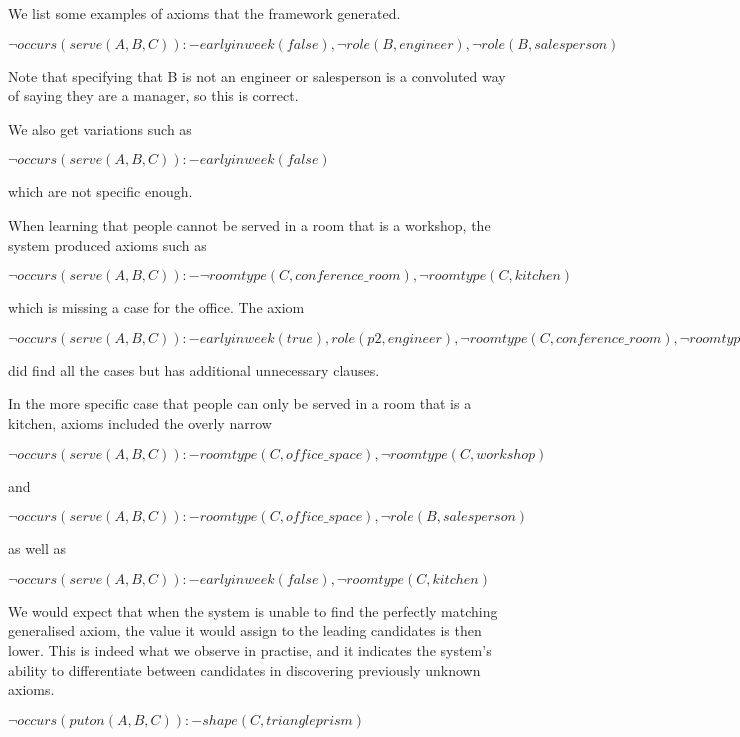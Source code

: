 We list some examples of axioms that the framework generated.

$\neg occurs(serve(A,B,C)) :- earlyinweek(false), \neg role(B,engineer), \neg role(B,salesperson)$

Note that specifying that B is not an engineer or salesperson is a 
convoluted way of saying they are a manager, so this is correct.

We also get variations such as 

$\neg occurs(serve(A,B,C)) :- earlyinweek(false)$

which are not specific enough.

When learning that people cannot be served in a room that is a workshop, the system produced
axioms such as 

$\neg occurs(serve(A,B,C)) :- \neg roomtype(C,conference\_room), \neg roomtype(C,kitchen)$

which is missing a case for the office. The axiom

$\neg occurs(serve(A,B,C)) :- earlyinweek(true), role(p2, engineer), \neg roomtype(C, conference\_room),
\neg roomtype(C, kitchen), \neg roomtype(C, office\_space)$

did find all the cases but has additional unnecessary clauses.

In the more specific case that people can only be served in a room that is a kitchen, 
axioms included the overly narrow

$\neg occurs(serve(A,B,C)) :- roomtype(C,office\_space), \neg roomtype(C,workshop)$

and

$\neg occurs(serve(A,B,C)) :- roomtype(C, office\_space), \neg role(B, salesperson)$

as well as 

$\neg occurs(serve(A,B,C)) :- earlyinweek(false), \neg roomtype(C, kitchen)$

%

We would expect that when the system is unable to find the perfectly matching 
generalised axiom, the value it would assign to the leading candidates is then lower. 
This is indeed what we observe in practise, and it indicates the system's 
ability to differentiate between candidates in discovering previously unknown axioms. 



%
$\neg occurs(puton(A,B,C)) :- shape(C,triangleprism)$



